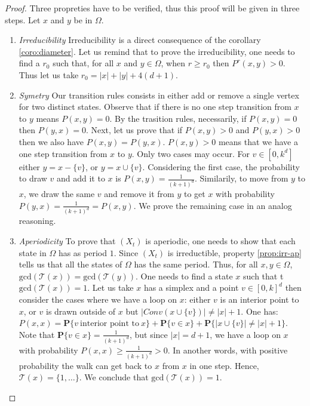 \documentclass[a4paper]{article}
\begin{document}
\begin{proof}
  Three propreties have to be verified, thus this proof will be given in three steps. Let $x$ and $y$ be in $\Omega$.

  \begin{enumerate}[i]
    \item \textit{Irreducibility}
    Irreducibility is a direct consequence of the corollary \ref{coro:diameter}. Let us remind that to prove the irreducibility, one needs to find a $r_0$ such that, for all $x$ and $y \in \Omega$, when $r \geq{r_0}$ then $P^r(x,y)>0$. Thus let us take $r_0 = |x| + |y| + 4(d+1)$.

     \item \textit{Symetry}
     Our transition rules consists in either add or remove a single vertex for two distinct states. Observe that if there is no one step transition from $x$ to $y$ means $P(x,y)=0$. By the trasition rules, necessarily, if $P(x,y)=0$ then $P(y,x)=0$.
     Next, let us prove that if $P(x,y)>0$ and $P(y,x)>0$ then we also have $P(x,y) = P(y,x)$. $P(x,y)>0$ means that we have a one step transition from $x$ to $y$. Only two cases may occur. For $v \in [0,k^d]$ either $y = x - \{v\}$, or $y = x \cup \{v\}$. Considering the first case, the probability to draw $v$ and add it to $x$ is $P(x,y) = \frac{1}{(k+1)^d}$. Similarily, to move from $y$ to $x$, we draw the same $v$ and remove it from $y$ to get $x$ with probability $P(y,x) = \frac{1}{(k+1)^d} = P(x,y)$. We prove the remaining case in an analog reasoning.

     \item \textit{Aperiodicity}
     To prove that $(X_t)$ is aperiodic, one needs to show that each state in $\Omega$ has as period $1$. Since $(X_t)$ is irreductible, property \ref{prop:irr-ap} tells us that all the states of $\Omega$ has the same period. Thus, for all $x, y \in \Omega$, $\mathrm{gcd}(\mathcal{T}(x)) = \mathrm{gcd}(\mathcal{T}(y))$. One needs to find a state $x$ such that t$\mathrm{gcd}(\mathcal{T}(x)) = 1$. Let us take $x$ has a simplex and a point $v \in [0,k]^d$ then consider the cases where we have a loop on $x$:
     either $v$ is an interior point to $x$, or $v$ is drawn outside of $x$ but $|Conv(x \cup \{v\})| \neq |x| + 1$. One has: $P(x,x) = \mathbf{P}\{v \  \mbox{interior point to} \ x\} + \mathbf{P}\{v \in x\} + \mathbf{P}\{|x \cup \{v\}| \neq |x| + 1\}$.
     Note that $\mathbf{P}\{v \in x\} = \frac{1}{(k+1)^d}$, but since $|x| = d+1$, we have a loop on $x$ with probability $P(x,x) \geq{\frac{1}{(k+1)^d}} > 0$. In another words, with positive probability the walk can get back to $x$ from $x$ in one step. Hence, $\mathcal{T}(x) = \{1, \dots\}$. We conclude that $\mathrm{gcd}(\mathcal{T}(x)) = 1$.

   \end{enumerate}
\end{proof}
\end{document}
